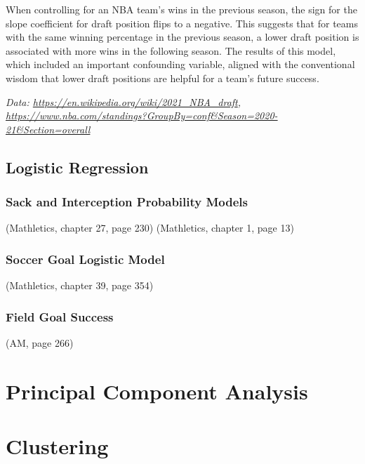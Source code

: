\documentclass[
  11pt,
]{book}
\theoremstyle{definition}
\theoremstyle{definition}
\theoremstyle{definition}
\theoremstyle{definition}
\theoremstyle{remark}
\begin{document}
When controlling for an NBA team's wins in the previous season, the sign for the slope coefficient for draft position flips to a negative. This suggests that for teams with the same winning percentage in the previous season, a lower draft position is associated with more wins in the following season. The results of this model, which included an important confounding variable, aligned with the conventional wisdom that lower draft positions are helpful for a team's future success.

\emph{Data: \url{https://en.wikipedia.org/wiki/2021_NBA_draft}, \url{https://www.nba.com/standings?GroupBy=conf\&Season=2020-21\&Section=overall}}

\hypertarget{logistic-regression}{%
\section{Logistic Regression}\label{logistic-regression}}

\hypertarget{sack-and-interception-probability-models}{%
\subsection{Sack and Interception Probability Models}\label{sack-and-interception-probability-models}}

(Mathletics, chapter 27, page 230)
(Mathletics, chapter 1, page 13)

\hypertarget{soccer-goal-logistic-model}{%
\subsection{Soccer Goal Logistic Model}\label{soccer-goal-logistic-model}}

(Mathletics, chapter 39, page 354)

\hypertarget{field-goal-success}{%
\subsection{Field Goal Success}\label{field-goal-success}}

(AM, page 266)

\newpage

\hypertarget{principal-component-analysis}{%
\chapter{Principal Component Analysis}\label{principal-component-analysis}}

\hypertarget{clustering}{%
\chapter{Clustering}\label{clustering}}
\end{document}
